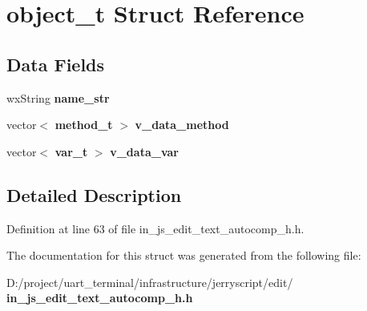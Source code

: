 \section{object\+\_\+t Struct Reference}
\label{structobject__t}
\subsection*{Data Fields}
\begin{DoxyCompactItemize}
\item 
\mbox{\label{structobject__t_a4f420117d8c68001f3c555687fee0d84}} 
wx\+String {\bfseries name\+\_\+str}
\item 
\mbox{\label{structobject__t_acaf7701ec6c2055497ad3e46ddd503bb}} 
vector$<$ \textbf{ method\+\_\+t} $>$ {\bfseries v\+\_\+data\+\_\+method}
\item 
\mbox{\label{structobject__t_a6cbeec88ebd288f8817d41e543502b58}} 
vector$<$ \textbf{ var\+\_\+t} $>$ {\bfseries v\+\_\+data\+\_\+var}
\end{DoxyCompactItemize}


\subsection{Detailed Description}


Definition at line 63 of file in\+\_\+js\+\_\+edit\+\_\+text\+\_\+autocomp\+\_\+h.\+h.



The documentation for this struct was generated from the following file\+:\begin{DoxyCompactItemize}
\item 
D\+:/project/uart\+\_\+terminal/infrastructure/jerryscript/edit/\textbf{ in\+\_\+js\+\_\+edit\+\_\+text\+\_\+autocomp\+\_\+h.\+h}\end{DoxyCompactItemize}
